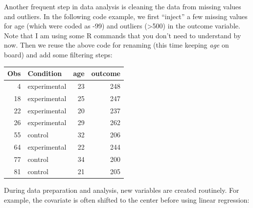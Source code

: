 \documentclass[]{svmono}
\newenvironment{Shaded}{\begin{snugshade}}{\end{snugshade}}
\newcommand{\KeywordTok}[1]{\textcolor[rgb]{0.13,0.29,0.53}{\textbf{#1}}}
\newcommand{\DataTypeTok}[1]{\textcolor[rgb]{0.13,0.29,0.53}{#1}}
\newcommand{\DecValTok}[1]{\textcolor[rgb]{0.00,0.00,0.81}{#1}}
\newcommand{\StringTok}[1]{\textcolor[rgb]{0.31,0.60,0.02}{#1}}
\newcommand{\OperatorTok}[1]{\textcolor[rgb]{0.81,0.36,0.00}{\textbf{#1}}}
\newcommand{\NormalTok}[1]{#1}
\theoremstyle{definition}
\theoremstyle{definition}
\theoremstyle{definition}
\theoremstyle{remark}
\begin{document}
\begin{Shaded}
\end{Shaded}

Another frequent step in data analysis is cleaning the data from missing
values and outliers. In the following code example, we first ``inject''
a few missing values for age (which were coded as -99) and outliers
(\textgreater{}500) in the outcome variable. Note that I am using some R
commands that you don't need to understand by now. Then we reuse the
above code for renaming (this time keeping \emph{age} on board) and add
some filtering steps:

\begin{Shaded}
\end{Shaded}

\begin{longtable}[]{@{}rlrr@{}}
\toprule
Obs & Condition & age & outcome\tabularnewline
\midrule
\endhead
4 & experimental & 23 & 248\tabularnewline
18 & experimental & 25 & 247\tabularnewline
22 & experimental & 20 & 237\tabularnewline
26 & experimental & 29 & 262\tabularnewline
55 & control & 32 & 206\tabularnewline
64 & experimental & 22 & 244\tabularnewline
77 & control & 34 & 200\tabularnewline
81 & control & 21 & 205\tabularnewline
\bottomrule
\end{longtable}

During data preparation and analysis, new variables are created
routinely. For example, the covariate is often shifted to the center
before using linear regression:
\end{document}
